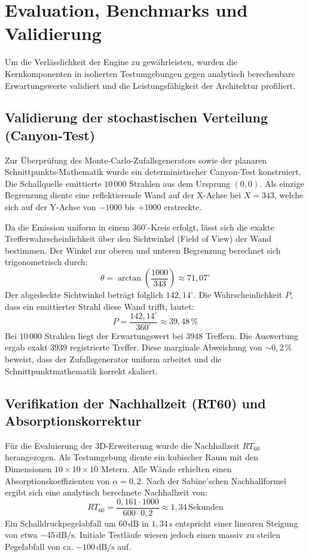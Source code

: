 


\section{Evaluation, Benchmarks und Validierung}
\label{sec:evaluation}

Um die Verlässlichkeit der Engine zu gewährleisten, wurden die Kernkomponenten in isolierten Testumgebungen gegen analytisch berechenbare Erwartungswerte validiert und die Leistungsfähigkeit der Architektur profiliert.

\subsection{Validierung der stochastischen Verteilung (Canyon-Test)}
\label{subsec:eval_montecarlo}

Zur Überprüfung des Monte-Carlo-Zufallsgenerators sowie der planaren Schnittpunkts-Mathematik wurde ein deterministischer Canyon-Test konstruiert. Die Schallquelle emittierte $10\,000$ Strahlen aus dem Ursprung $(0,0)$. Als einzige Begrenzung diente eine reflektierende Wand auf der X-Achse bei $X = 343$, welche sich auf der Y-Achse von $-1000$ bis $+1000$ erstreckte.

Da die Emission uniform in einem $360^\circ$-Kreis erfolgt, lässt sich die exakte Trefferwahrscheinlichkeit über den Sichtwinkel (Field of View) der Wand bestimmen. Der Winkel zur oberen und unteren Begrenzung berechnet sich trigonometrisch durch:
\[ \theta = \arctan\left(\frac{1000}{343}\right) \approx 71{,}07^\circ \]
Der abgedeckte Sichtwinkel beträgt folglich $142{,}14^\circ$. Die Wahrscheinlichkeit $P$, dass ein emittierter Strahl diese Wand trifft, lautet:
\[ P = \frac{142{,}14^\circ}{360^\circ} \approx 39{,}48\,\% \]
Bei $10\,000$ Strahlen liegt der Erwartungswert bei $3948$ Treffern. Die Auswertung ergab exakt $3939$ registrierte Treffer. Diese marginale Abweichung von $\sim 0{,}2\,\%$ beweist, dass der Zufallsgenerator uniform arbeitet und die Schnittpunktmathematik korrekt skaliert.

\subsection{Verifikation der Nachhallzeit (RT60) und Absorptionskorrektur}
\label{subsec:eval_rt60}

Für die Evaluierung der 3D-Erweiterung wurde die Nachhallzeit $RT_{60}$ herangezogen. Als Testumgebung diente ein kubischer Raum mit den Dimensionen $10 \times 10 \times 10$ Metern. Alle Wände erhielten einen Absorptionskoeffizienten von $\alpha = 0{,}2$.
Nach der Sabine'schen Nachhallformel \parencite{kuttruff2016} ergibt sich eine analytisch berechnete Nachhallzeit von:
\[ RT_{60} = \frac{0{,}161 \cdot 1000}{600 \cdot 0{,}2} \approx 1{,}34\,\text{Sekunden} \]
Ein Schalldruckpegelabfall um $60\,\text{dB}$ in $1{,}34\,\text{s}$ entspricht einer linearen Steigung von etwa $-45\,\text{dB/s}$.
Initiale Testläufe wiesen jedoch einen massiv zu steilen Pegelabfall von ca. $-100\,\text{dB/s}$ auf.

